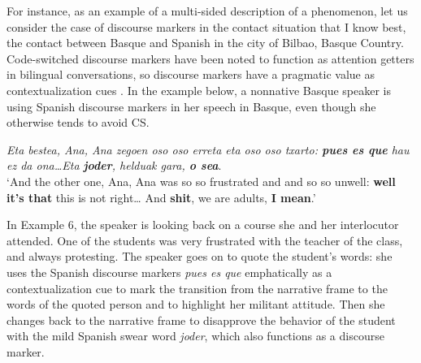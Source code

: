 \documentclass[output=paper,
modfonts
]{langscibook}
\begin{document}
For instance, as an example of a multi-sided description of a phenomenon, let us consider the case of discourse markers in the contact situation that I know best, the contact between Basque and Spanish in the city of Bilbao, Basque Country. Code-switched discourse markers have been noted to function as attention getters in bilingual conversations, so discourse markers have a pragmatic value as contextualization cues \parencite{maschler1997discourse}. In the example below, a nonnative Basque speaker is using Spanish discourse markers in her speech in Basque, even though she otherwise tends to avoid CS. \\

\begin{exe}
\label{nonnative}
\begin{ex}
\textit{Eta bestea, Ana, Ana zegoen oso oso erreta eta oso oso txarto: \textbf{pues es que} hau ez da ona…Eta \textbf{joder}, helduak gara, \textbf{o sea}}.\\
`And the other one, Ana, Ana was so so frustrated and and so so unwell: \textbf{well it's that} this is not right… And \textbf{shit}, we are adults, \textbf{ I mean}.'
\end{ex}
\end{exe}

\noindent In Example 6, the speaker is looking back on a course she and her interlocutor attended. One of the students was very frustrated with the teacher of the class, and always protesting. The speaker goes on to quote the student’s words: she uses the Spanish discourse markers \textit{pues es que} emphatically as a contextualization cue to mark the transition from the narrative frame to the words of the quoted person and to highlight her militant attitude. Then she changes back to the narrative frame to disapprove the behavior of the student with the mild Spanish swear word \textit{joder}, which also functions as a discourse marker.
\end{document}
